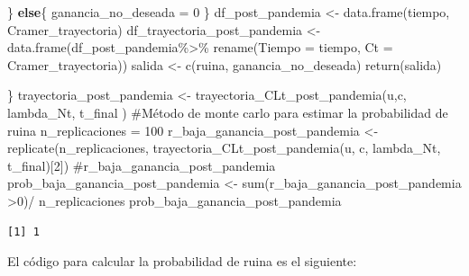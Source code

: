 \documentclass[
  us-letterpaper,
]{scrreprt}
\newenvironment{Shaded}{\begin{snugshade}}{\end{snugshade}}
\newcommand{\AttributeTok}[1]{\textcolor[rgb]{0.40,0.45,0.13}{#1}}
\newcommand{\CommentTok}[1]{\textcolor[rgb]{0.37,0.37,0.37}{#1}}
\newcommand{\ControlFlowTok}[1]{\textcolor[rgb]{0.00,0.23,0.31}{\textbf{#1}}}
\newcommand{\DecValTok}[1]{\textcolor[rgb]{0.68,0.00,0.00}{#1}}
\newcommand{\FunctionTok}[1]{\textcolor[rgb]{0.28,0.35,0.67}{#1}}
\newcommand{\NormalTok}[1]{\textcolor[rgb]{0.00,0.23,0.31}{#1}}
\newcommand{\OtherTok}[1]{\textcolor[rgb]{0.00,0.23,0.31}{#1}}
\newcommand{\SpecialCharTok}[1]{\textcolor[rgb]{0.37,0.37,0.37}{#1}}
\theoremstyle{definition}
\theoremstyle{plain}
\theoremstyle{plain}
\theoremstyle{remark}
\begin{document}
\begin{Shaded}
\begin{Highlighting}[]
\NormalTok{  \} }
  \ControlFlowTok{else}\NormalTok{\{}
\NormalTok{    ganancia\_no\_deseada }\OtherTok{=} \DecValTok{0}
\NormalTok{  \}}
\NormalTok{  df\_post\_pandemia }\OtherTok{\textless{}{-}} \FunctionTok{data.frame}\NormalTok{(tiempo, Cramer\_trayectoria)}
\NormalTok{  df\_trayectoria\_post\_pandemia }\OtherTok{\textless{}{-}} \FunctionTok{data.frame}\NormalTok{(df\_post\_pandemia}\SpecialCharTok{\%\textgreater{}\%}
                                            \FunctionTok{rename}\NormalTok{(}\AttributeTok{Tiempo =}\NormalTok{ tiempo, }
                                            \AttributeTok{Ct =}\NormalTok{ Cramer\_trayectoria))}
\NormalTok{  salida }\OtherTok{\textless{}{-}} \FunctionTok{c}\NormalTok{(ruina, ganancia\_no\_deseada)}
  \FunctionTok{return}\NormalTok{(salida)}
  
\NormalTok{\}}
\NormalTok{trayectoria\_post\_pandemia }\OtherTok{\textless{}{-}} \FunctionTok{trayectoria\_CLt\_post\_pandemia}\NormalTok{(u,c,}
\NormalTok{                                            lambda\_Nt, t\_final )}
\CommentTok{\#Método de monte carlo para estimar la probabilidad de ruina}
\NormalTok{n\_replicaciones }\OtherTok{=} \DecValTok{100}
\NormalTok{r\_baja\_ganancia\_post\_pandemia }\OtherTok{\textless{}{-}} \FunctionTok{replicate}\NormalTok{(n\_replicaciones, }
          \FunctionTok{trayectoria\_CLt\_post\_pandemia}\NormalTok{(u, c, lambda\_Nt, t\_final)[}\DecValTok{2}\NormalTok{])}
\CommentTok{\#r\_baja\_ganancia\_post\_pandemia }
\NormalTok{prob\_baja\_ganancia\_post\_pandemia }\OtherTok{\textless{}{-}} \FunctionTok{sum}\NormalTok{(r\_baja\_ganancia\_post\_pandemia }\SpecialCharTok{\textgreater{}}\DecValTok{0}\NormalTok{)}\SpecialCharTok{/}
\NormalTok{n\_replicaciones}
\NormalTok{prob\_baja\_ganancia\_post\_pandemia}
\end{Highlighting}
\end{Shaded}

\begin{verbatim}
[1] 1
\end{verbatim}

El código para calcular la probabilidad de ruina es el siguiente:
\end{document}
